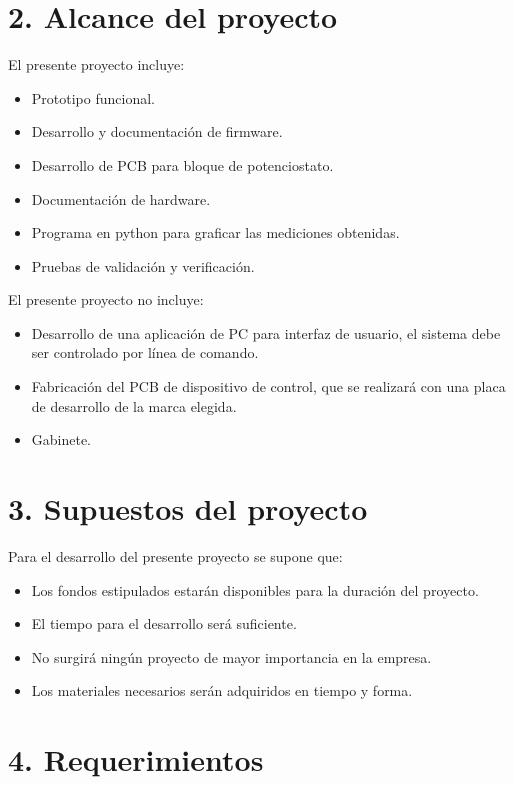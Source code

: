 \documentclass[11pt]{charter}
\begin{document}
\section{2. Alcance del proyecto}
\label{sec:alcance}

El presente proyecto incluye:
\begin{itemize}
\item Prototipo funcional.
\item Desarrollo y documentación de firmware.
\item Desarrollo de PCB para bloque de potenciostato.
\item Documentación de hardware.
\item Programa en python para graficar las mediciones obtenidas.  
\item Pruebas de validación y verificación.
\end{itemize}

El presente proyecto no incluye:
\begin{itemize}
\item Desarrollo de una aplicación de PC para interfaz de usuario, el sistema debe ser controlado por línea de comando.
\item Fabricación del PCB de dispositivo de control, que se realizará con una placa de desarrollo de la marca elegida.
\item Gabinete.
\end{itemize}


\section{3. Supuestos del proyecto}
\label{sec:supuestos}
Para el desarrollo del presente proyecto se supone que:
\begin{itemize}
\item Los fondos estipulados estarán disponibles para la duración del proyecto.
\item El tiempo para el desarrollo será suficiente.
\item No surgirá ningún proyecto de mayor importancia en la empresa.
\item Los materiales necesarios serán adquiridos en tiempo y forma.
\end{itemize}

\section{4. Requerimientos}
\label{sec:requerimientos}
\end{document}
